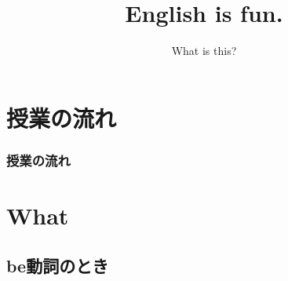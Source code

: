 \documentclass[aspectratio=169,xcolor={dvipsnames,table}]{beamer}
\title{English is fun.}
\subtitle{What is this?}
\author{}
\institute[]{}
\date[]
\begin{document}
\begin{frame}[plain]
  \titlepage
\end{frame}

\section*{授業の流れ}
\begin{frame}[plain]
  \frametitle{授業の流れ}
  \tableofcontents
\end{frame}

\section{What }
\subsection{be動詞のとき}
\end{document}
